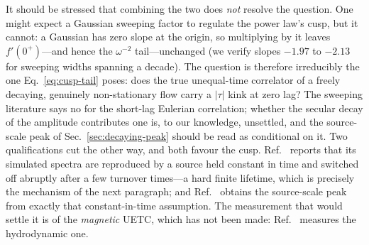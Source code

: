 \documentclass[10pt,prd,aps,nobibnotes,superscriptaddress,preprintnumbers,notitlepage]{revtex4-1}
\begin{document}
It should be stressed that combining the two does \emph{not} resolve the question. One
might expect a Gaussian sweeping factor to regulate the power law's cusp, but it cannot:
a Gaussian has zero slope at the origin, so multiplying by it leaves $f'(0^{+})$---and
hence the $\omega^{-2}$ tail---unchanged (we verify slopes $-1.97$ to $-2.13$ for
sweeping widths spanning a decade). The question is therefore irreducibly the one
Eq.~\eqref{eq:cusp-tail} poses: does the true unequal-time correlator of a freely
decaying, genuinely non-stationary flow carry a $|\tau|$ kink at zero lag? The sweeping
literature says no for the short-lag Eulerian correlation; whether the secular decay of
the amplitude contributes one is, to our knowledge, unsettled, and the source-scale peak
of Sec.~\ref{sec:decaying-peak} should be read as conditional on it. Two qualifications
cut the other way, and both favour the cusp. Ref.~\cite{Auclair:2022jod} reports that its
simulated spectra are reproduced by a source held constant in time and switched off
abruptly after a few turnover times---a hard finite lifetime, which is precisely the
mechanism of the next paragraph; and Ref.~\cite{RoperPol:2022iel} obtains the
source-scale peak from exactly that constant-in-time assumption. The measurement that
would settle it is of the \emph{magnetic} UETC, which has not been made:
Ref.~\cite{Auclair:2022jod} measures the hydrodynamic one.
\end{document}
